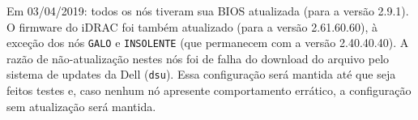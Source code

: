 
Em 03/04/2019: todos os nós tiveram sua BIOS atualizada (para a versão 2.9.1). O firmware do iDRAC foi também atualizado (para a versão 2.61.60.60), à exceção dos nós \texttt{GALO} e \texttt{INSOLENTE} (que permanecem com a versão 2.40.40.40). A razão de não-atualização nestes nós foi de falha do download do arquivo pelo sistema de updates da Dell (\texttt{dsu}). Essa configuração será mantida 
até que seja feitos testes e, caso nenhum nó apresente comportamento errático, 
a configuração sem atualização será mantida.



